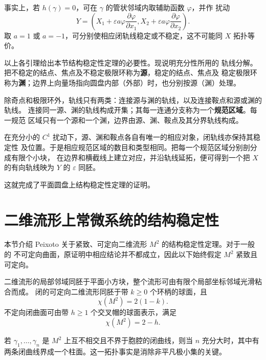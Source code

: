 事实上，若 $h(\gamma)=0$，可在 $\gamma$ 的管状邻域内取辅助函数 $\varphi$，并作
扰动
\[
Y=\left(X_1+\varepsilon a\varphi\dfrac{\partial\varphi}{\partial x_1},
X_2+\varepsilon a\varphi\dfrac{\partial\varphi}{\partial x_2}\right).
\]
取 $a=1$ 或 $a=-1$，可分别使相应闭轨线稳定或不稳定，这不可能同 $X$ 拓扑等价。


以上各引理给出本节结构稳定性定理的必要性。现说明充分性所用的
轨线分解。把不稳定的结点、焦点及不稳定极限环称为\textbf{源}，稳定的结点、焦点及
稳定极限环称为\textbf{渊}；边界上向量场指向圆盘内部（外部）时，也分别按源（渊）处理。

除奇点和极限环外，轨线只有两类：连接源与渊的轨线，以及连接鞍点和源或渊的轨线。
连接同一源、渊的轨线构成开集；其每一连通分支称为一个\textbf{规范区域}。每一规范
区域只有一个源和一个渊，边界由源、渊、鞍点及其分界轨线构成。


在充分小的 $C^1$ 扰动下，源、渊和鞍点各自有唯一的相应对象，闭轨线亦保持其稳定性
及位置。于是相应规范区域的数目和类型相同。把每一个规范区域分别剖分成有限个小块，
在边界和横截线上建立对应，并沿轨线延拓，便可得到一个把 $X$ 的有向轨线映为 $Y$ 的
$\varepsilon$ 同胚。


这就完成了平面圆盘上结构稳定性定理的证明。

\section{二维流形上常微系统的结构稳定性}

本节介绍 Peixoto 关于紧致、可定向二维流形 $M^2$ 的结构稳定性定理。对于一般的
不可定向曲面，原证明中相应结论并不都成立，因此以下始终假定 $M^2$ 紧致且可定向。

二维流形的局部邻域同胚于平面小方块，整个流形可由有限个局部坐标邻域光滑粘合而成。
闭的可定向二维流形同胚于带 $k\geq0$ 个环柄的球面，且
\[
  \chi(M^2)=2(1-k).
\]
不定向闭曲面可由带 $h\geq1$ 个交叉帽的球面表示，满足
\[
  \chi(M^2)=2-h.
\]


若 $\gamma_1,\ldots,\gamma_n$ 是 $M^2$ 上互不相交且不界于胞腔的闭曲线，则当 $n$
充分大时，其中有两条闭曲线界成一个柱面。这一拓扑事实是消除非平凡极小集的关键。

